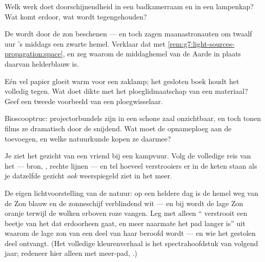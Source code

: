\begin{exercise}[$\star$]\label{exo:g7:light-sources-propagation:7}
Welk werk doet doorschijnendheid in een badkamerraam en in een
lampenkap? Wat komt erdoor, wat wordt tegengehouden?
\end{exercise}

\begin{exercise}[$\star$]\label{exo:g7:light-sources-propagation:8}
De  wordt door de zon beschenen --- en toch zagen maanastronauten
om twaalf uur 's middags een zwarte hemel. Verklaar dat met
\cref{rem:g7:light-sources-propagation:space}, en zeg waarom de
middaghemel van de Aarde in plaats daarvan helderblauw is.
\end{exercise}

\begin{exercise}[$\star\star$]\label{exo:g7:light-sources-propagation:9}
Eén vel papier gloeit warm voor een zaklamp; het gesloten boek houdt
het  volledig tegen. Wat doet dikte met het ploeglidmaatschap van
een materiaal? Geef een tweede voorbeeld van een ploegwisselaar.
\end{exercise}

\begin{exercise}[$\star\star$]\label{exo:g7:light-sources-propagation:10}
Bioscooptruc: projectorbundels zijn in een schone zaal onzichtbaar,
en toch tonen films ze dramatisch door de  snijdend. Wat moet de
opnameploeg aan de  toevoegen, en welke natuurkunde kopen ze
daarmee?
\end{exercise}

\begin{exercise}[$\star\star$]\label{exo:g7:light-sources-propagation:11}
Je ziet het gezicht van een vriend bij een kampvuur. Volg de volledige
reis van het  --- bron, , rechte lijnen --- en tel
hoeveel verstrooiers er in de keten staan als je datzelfde gezicht
\emph{ook} weerspiegeld ziet in het meer.
\end{exercise}

\begin{exercise}[$\star\star\star$]\label{exo:g7:light-sources-propagation:12}
De eigen lichtvoorstelling van de natuur: op een heldere dag is de
hemel weg van de Zon blauw en de zonneschijf verblindend wit --- en bij
 wordt de lage Zon oranje terwijl de wolken erboven roze
vangen. Leg met alleen `` verstrooit een beetje van het
 dat erdoorheen gaat, en meer naarmate het pad langer is'' uit
waarom de lage zon van een deel van haar  beroofd wordt --- en
wie het gestolen deel ontvangt. (Het volledige kleurenverhaal is het
spectrahoofdstuk van volgend jaar; redeneer hier alleen met
meer-pad, .)
\end{exercise}

